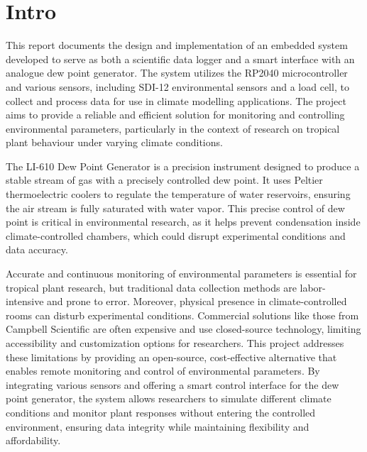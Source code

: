 \section{Intro}

This report documents the design and implementation of an embedded system developed to serve as both a scientific data logger and a smart interface with an analogue dew point generator. The system utilizes the RP2040 microcontroller and various sensors, including SDI-12 environmental sensors and a load cell, to collect and process data for use in climate modelling applications. The project aims to provide a reliable and efficient solution for monitoring and controlling environmental parameters, particularly in the context of research on tropical plant behaviour under varying climate conditions.

The LI-610 Dew Point Generator is a precision instrument designed to produce a stable stream of gas with a precisely controlled dew point. It uses Peltier thermoelectric coolers to regulate the temperature of water reservoirs, ensuring the air stream is fully saturated with water vapor. This precise control of dew point is critical in environmental research, as it helps prevent condensation inside climate-controlled chambers, which could disrupt experimental conditions and data accuracy.

Accurate and continuous monitoring of environmental parameters is essential for tropical plant research, but traditional data collection methods are labor-intensive and prone to error. Moreover, physical presence in climate-controlled rooms can disturb experimental conditions. Commercial solutions like those from Campbell Scientific are often expensive and use closed-source technology, limiting accessibility and customization options for researchers. This project addresses these limitations by providing an open-source, cost-effective alternative that enables remote monitoring and control of environmental parameters. By integrating various sensors and offering a smart control interface for the dew point generator, the system allows researchers to simulate different climate conditions and monitor plant responses without entering the controlled environment, ensuring data integrity while maintaining flexibility and affordability.

